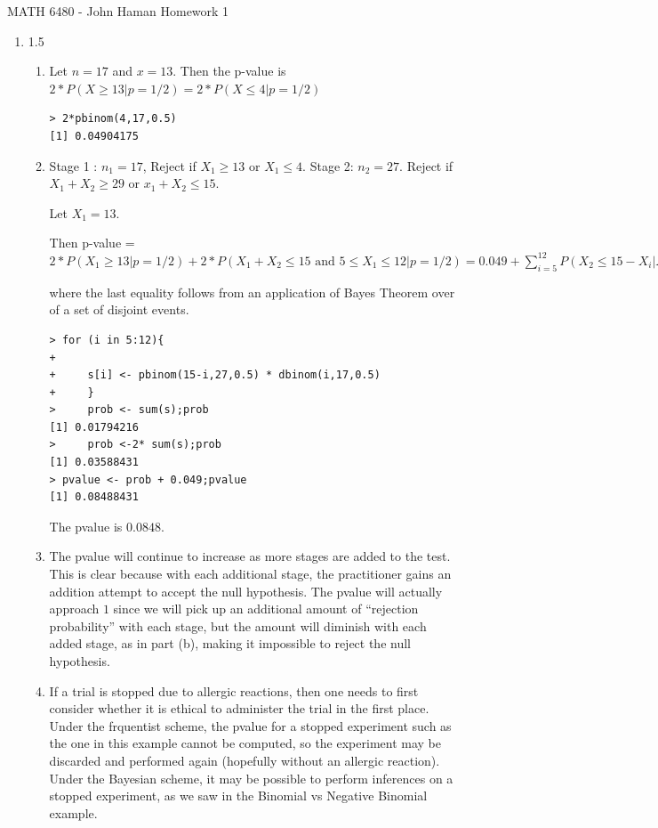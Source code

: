 \documentclass[12pt]{article}
\newcommand{\CourseName}{\textsf{MATH 6480 - John Haman }}
\begin{document}
\medskip
\begin{flushleft}
  \CourseName \hfill \textsf{Homework 1}\\
\medskip





\begin{enumerate}

\item 1.5 
\begin{enumerate}

\item Let $n = 17$ and $x = 13$. Then the p-value is $2*P(X\geq13|p=1/2) =2*P(X\leq 4|p=1/2) $ 

\begin{verbatim}
> 2*pbinom(4,17,0.5)
[1] 0.04904175
\end{verbatim}

\item Stage 1 : $n_1 = 17$, Reject if $X_1 \geq 13 $ or $X_1 \leq 4$. Stage 2: $n_2 = 27$. Reject if $X_1 + X_2 \geq 29 $ or $x_1 + X_2 \leq 15$.

Let $X_1 = 13$.

Then p-value = $2*P(X_1 \geq 13| p=1/2) + 2*P(X_1 + X_2 \leq 15 \,\, \textrm{and} \,\, 5 \leq X_1 \leq 12 | p = 1/2) = 0.049 + \sum_{i=5}^{12} P( X_2 \leq 15 - X_i | X_1 = i)*P(X_1 = i)$ 

where the last equality follows from an application of Bayes Theorem over of a set of disjoint events. 

\begin{verbatim}
> for (i in 5:12){
+ 
+     s[i] <- pbinom(15-i,27,0.5) * dbinom(i,17,0.5)
+     }
>     prob <- sum(s);prob
[1] 0.01794216
>     prob <-2* sum(s);prob
[1] 0.03588431
> pvalue <- prob + 0.049;pvalue
[1] 0.08488431
\end{verbatim}

The pvalue is $0.0848$.

\item The pvalue will continue to increase as more stages are added to the test. This is clear because with each additional stage, the practitioner gains an addition attempt to accept the null hypothesis. The pvalue will actually approach $1$ since we will pick up an additional amount of ``rejection probability'' with each stage, but the amount will diminish with each added stage, as in part (b), making it impossible to reject the null hypothesis.

\item If a trial is stopped due to allergic reactions, then one needs to first consider whether it is ethical to administer the trial in the first place. Under the frquentist scheme, the pvalue for a stopped experiment such as the one in this example cannot be computed, so the experiment may be discarded and performed again (hopefully without an allergic reaction). Under the Bayesian scheme, it may be possible to perform inferences on a stopped experiment, as we saw in the Binomial vs Negative Binomial example. 


\end{enumerate}
\end{enumerate}
\end{flushleft}
\end{document}

